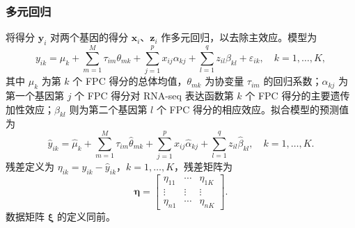 \subsubsection{多元回归}
将得分 $\mathbf y_i$ 对两个基因的得分 $\mathbf x_i$、$\mathbf z_i$ 作多元回归，以去除主效应。模型为
\begin{equation}
y_{ik}=\mu_k+\sum_{m=1}^{M}\tau_{im}\theta_{mk}
+\sum_{j=1}^{p}x_{ij}\alpha_{kj}+\sum_{l=1}^{q}z_{il}\beta_{kl}+\varepsilon_{ik},
\quad k=1,\ldots,K,
\tag{4.130}
\end{equation}
其中 $\mu_k$ 为第 $k$ 个 FPC 得分的总体均值，$\theta_{mk}$ 为协变量 $\tau_{im}$ 的回归系数；$\alpha_{kj}$ 为第一个基因第 $j$ 个 FPC 得分对 RNA-seq 表达函数第 $k$ 个 FPC 得分的主要遗传加性效应；$\beta_{kl}$ 则为第二个基因第 $l$ 个 FPC 得分的相应效应。拟合模型的预测值为
\begin{equation}
\hat y_{ik}=\hat\mu_k+\sum_{m=1}^{M}\tau_{im}\hat\theta_{mk}
+\sum_{j=1}^{p}x_{ij}\hat\alpha_{kj}+\sum_{l=1}^{q}z_{il}\hat\beta_{kl},
\quad k=1,\ldots,K.
\tag{4.131}
\end{equation}
残差定义为 $\eta_{ik}=y_{ik}-\hat y_{ik}$，$k=1,\ldots,K$，残差矩阵为
\[
\boldsymbol\eta=\begin{bmatrix}\eta_{11}&\cdots&\eta_{1K}\\\vdots&\vdots&\vdots\\\eta_{n1}&\cdots&\eta_{nK}\end{bmatrix}.
\]
数据矩阵 $\boldsymbol\xi$ 的定义同前。

